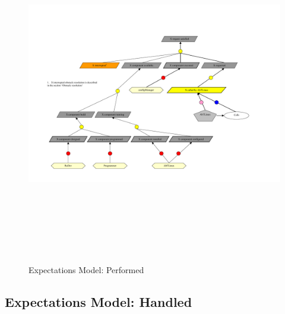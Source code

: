\begin{figure}[htbp]
  \centering
  \includegraphics[angle=90,width=15cm,height=15cm]{"ExpectationsPerformed"}
  \caption{Expectations Model: Performed}
  \label{fig:expermodel}
\end{figure}

\newpage
\subsection{Expectations Model: Handled}

